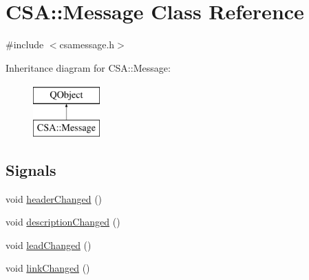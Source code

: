 \hypertarget{classCSA_1_1Message}{}\section{C\+SA\+:\+:Message Class Reference}
\label{classCSA_1_1Message}


{\ttfamily \#include $<$csamessage.\+h$>$}

Inheritance diagram for C\+SA\+:\+:Message\+:\begin{figure}[H]
\begin{center}
\leavevmode
\includegraphics[height=2.000000cm]{classCSA_1_1Message}
\end{center}
\end{figure}
\subsection*{Signals}
\begin{DoxyCompactItemize}
\item 
void \mbox{\hyperlink{classCSA_1_1Message_a2d58350e147ba775ea6e4984d4ac0bd9}{header\+Changed}} ()
\item 
void \mbox{\hyperlink{classCSA_1_1Message_a3aa4f9f897726496236f8f44e62a2e98}{description\+Changed}} ()
\item 
void \mbox{\hyperlink{classCSA_1_1Message_a07926969b6de9fcea2a41de78d53a8db}{lead\+Changed}} ()
\item 
void \mbox{\hyperlink{classCSA_1_1Message_a570a510caf83d71d37b8e8a3d625be54}{link\+Changed}} ()
\end{DoxyCompactItemize}
